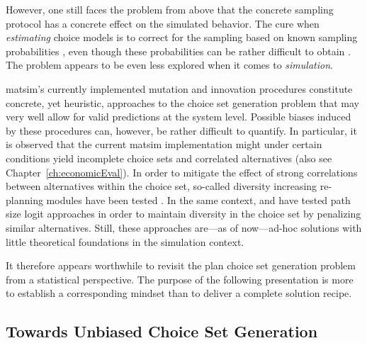 However, one still faces the problem from above that the concrete sampling protocol has a concrete effect on the simulated behavior. The cure when \emph{estimating} choice models is to correct for the sampling based on known sampling probabilities \citep[e.g.][Chapter 9]{BenAkivaLerman_1985}, even though these probabilities can be rather difficult to obtain \citep{floetteroed-2012b, frejinger-2009}. The problem appears to be even less explored when it comes to \emph{simulation}. 

\gls{matsim}'s currently implemented mutation and innovation procedures
constitute concrete, yet heuristic, approaches to the choice set generation
problem that may very well allow for valid predictions at the system level.
%
%
%
Possible biases induced by these procedures can, however, be rather difficult to quantify.
%
%
In particular, it is observed that the current \gls{matsim} implementation might under certain conditions yield incomplete choice sets and correlated alternatives (also see Chapter~\ref{ch:economicEval}).
%
In order to mitigate the effect of strong correlations between alternatives within the choice set, so-called diversity increasing re-planning modules have been tested \citep[see, e.g.,][]{NagelKickhoeferJoubert2014HeterogeneousVoTsPROCEDIA}. In the same context, \citet[][Chapter~6]{Grether_PhDThesis_2014} and \cite{NeumannEtAlPassengerArrivalPatterns} have tested path size logit approaches \citep[see, e.g.,][]{DaganzoSheffi_TransScience_1977,FrejingerBierlaire_TransResB_2007} in order to maintain diversity in the choice set by penalizing similar alternatives.
%
Still, these approaches are---as of now---ad-hoc solutions with little theoretical foundations in the simulation context.

It therefore appears worthwhile to revisit the plan choice set generation
%
%
problem from a statistical perspective. 
The purpose of the following presentation is more to establish a corresponding 
mindset than to deliver a complete solution recipe.

\subsection{Towards Unbiased Choice Set Generation}

